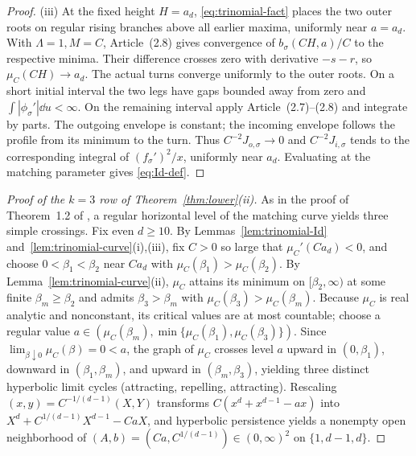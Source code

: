 \begin{proof}
(iii) At the fixed height $H=a_d$, \eqref{eq:trinomial-fact}
places the two outer roots on regular rising branches above all earlier
maxima, uniformly near $a=a_d$. With $\Lambda=1,M=C$, Article~(2.8)
gives convergence of $b_\sigma(CH,a)/C$ to the respective minima.
Their difference crosses zero with derivative $-s-r$, so
$\mu_C(CH)\to a_d$. The actual turns converge uniformly to the outer
roots. On a short initial interval the two legs have gaps bounded away
from zero and $\int|\phi_\sigma'|\dd u<\infty$. On the remaining
interval apply Article~(2.7)--(2.8) and integrate by parts. The
outgoing envelope is constant; the incoming envelope follows the
profile from its minimum to the turn. Thus $C^{-2}J_{o,\sigma}\to0$
and $C^{-2}J_{i,\sigma}$ tends to the corresponding integral of
$(f_\sigma')^2/x$, uniformly near $a_d$. Evaluating at the matching
parameter gives \eqref{eq:Id-def}.
\end{proof}

\begin{proof}[Proof of the $k=3$ row of Theorem~\ref{thm:lower}\textup{(ii)}]
As in the proof of Theorem~1.2 of \cite{CJLZ}, a regular horizontal
level of the matching curve yields three simple crossings.
Fix even $d\ge 10$. By Lemmas~\ref{lem:trinomial-Id} and~\ref{lem:trinomial-curve}(i),(iii), fix $C>0$
so large that $\mu_C'(Ca_d)<0$, and choose $0<\beta_1<\beta_2$ near $Ca_d$ with
$\mu_C(\beta_1)>\mu_C(\beta_2)$. By Lemma~\ref{lem:trinomial-curve}(ii), $\mu_C$ attains its minimum
on $[\beta_2,\infty)$ at some finite $\beta_m\ge\beta_2$ and admits $\beta_3>\beta_m$ with
$\mu_C(\beta_3)>\mu_C(\beta_m)$. Because $\mu_C$ is real analytic and nonconstant, its critical values
are at most countable; choose a regular value
$a\in(\mu_C(\beta_m),\min\{\mu_C(\beta_1),\mu_C(\beta_3)\})$. Since $\lim_{\beta\downarrow
0}\mu_C(\beta)=0<a$, the graph of $\mu_C$ crosses level $a$ upward in $(0,\beta_1)$, downward in
$(\beta_1,\beta_m)$, and upward in $(\beta_m,\beta_3)$, yielding three distinct hyperbolic limit
cycles (attracting, repelling, attracting). Rescaling $(x,y)=C^{-1/(d-1)}(X,Y)$ transforms
$C(x^d+x^{d-1}-ax)$ into $X^d+C^{1/(d-1)}X^{d-1}-CaX$, and hyperbolic persistence yields a nonempty
open neighborhood of $(A,b)=(Ca,C^{1/(d-1)})\in(0,\infty)^2$ on $\{1,d-1,d\}$.
\end{proof}
